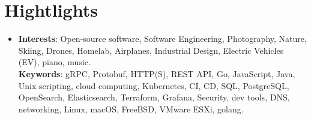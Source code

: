 \documentclass[letterpaper,12pt]{article}
\begin{document}
\section{Hightlights}
 \begin{itemize}[leftmargin=0.15in, label={}]
    \item{
     \textbf{Interests}{: Open-source software, Software Engineering, Photography, Nature, Skiing, Drones, Homelab, Airplanes, Industrial Design, Electric Vehicles (EV), piano, music.} \\
      \textbf{Keywords}{: gRPC, Protobuf, HTTP(S), REST API, Go, JavaScript, Java, Unix scripting, cloud computing, Kubernetes, CI, CD, SQL, PostgreSQL, OpenSearch, Elasticsearch, Terraform, Grafana, Security, dev tools, DNS, networking, Linux, macOS, FreeBSD, VMware ESXi, golang.}
    }
 \end{itemize}
 
\end{document}

